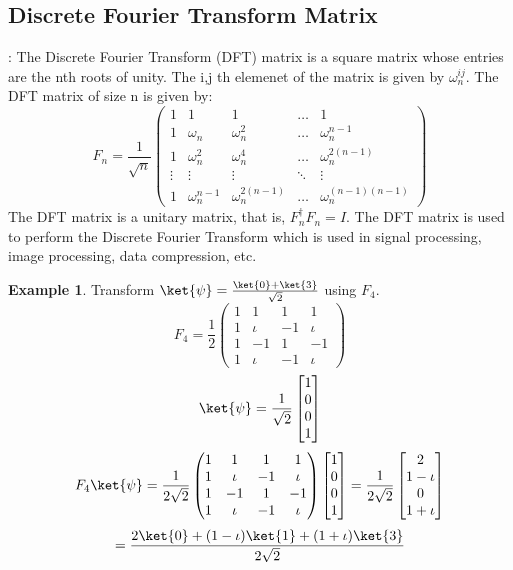 \documentclass[12pt, oneside]{book}
\theoremstyle{definition}
\theoremstyle{definition}
\newtheorem{example}{Example}[section]
\theoremstyle{remark}
\begin{document}
\subsection{Discrete Fourier Transform Matrix}: The Discrete Fourier Transform (DFT) matrix is a square matrix whose entries are the nth roots of unity. The i,j th elemenet of the matrix is given by $\omega_n^{ij}$.
 The DFT matrix of size n is given by:
\[ F_n=\dfrac{1}{\sqrt{n}}\begin{pmatrix} 1 & 1 & 1 & \ldots & 1 \\ 1 & \omega_n & \omega_n^2 & \ldots & \omega_n^{n-1} \\ 1 & \omega_n^2 & \omega_n^4 & \ldots & \omega_n^{2(n-1)} \\ \vdots & \vdots & \vdots & \ddots & \vdots \\ 1 & \omega_n^{n-1} & \omega_n^{2(n-1)} & \ldots & \omega_n^{(n-1)(n-1)} \end{pmatrix} \]
The DFT matrix is a unitary matrix, that is, $F_n^{\dagger}F_n=I$. The DFT matrix is used to perform the Discrete Fourier Transform which is used in signal processing, image processing, data compression, etc.

\begin{example}
    Transform $\ket{\psi}=\frac{\ket{0}+\ket{3}}{\sqrt{2}}$ using $F_4$.
    \[ F_4=\dfrac{1}{2}\begin{pmatrix} 1 & 1 & 1 & 1 \\ 1 & \iota & -1 & \iota \\ 1 & -1 & 1 & -1 \\ 1 & \iota & -1 &\iota \end{pmatrix} \]
    \[ \ket{\psi}=\frac{1}{\sqrt{2}}\begin{bmatrix} 1 \\0 \\ 0 \\ 1 \end{bmatrix} \]
    \[ F_4\ket{\psi}=\dfrac{1}{2\sqrt{2}}\begin{pmatrix} 1 & 1 & 1 & 1 \\ 1 &\iota & -1 & \iota \\ 1 & -1 & 1 & -1 \\ 1 & \iota & -1 &\iota \end{pmatrix}\begin{bmatrix} 1 \\0 \\ 0 \\ 1 \end{bmatrix}=\dfrac{1}{2\sqrt{2}}\begin{bmatrix} 2 \\ 1-\iota  \\ 0 \\ 1+\iota \end{bmatrix} \]
    \[ =\dfrac{2\ket{0}+(1-\iota)\ket{1}+(1+\iota)\ket{3}}{2\sqrt{2}}\]
\end{example}
\end{document}
